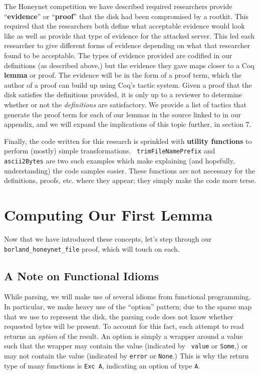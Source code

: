 \documentclass[nocopyrightspace]{sigplanconf}
\begin{document}
The Honeynet competition we have described required researchers provide
``{\bf evidence}'' or ``{\bf proof}'' that the disk had been compromised by a
rootkit. This required that the researchers both define what acceptable
evidence would look like as well as provide that type of evidence for the
attacked server. This led each researcher to give different forms of evidence
depending on what that researcher found to be acceptable. The types of
evidence provided are codified in our definitions (as described above,) but
the evidence they gave maps closer to a Coq {\bf lemma} or proof. The evidence
will be in the form of a proof term, which the author of a proof can build up
using Coq's tactic system. Given a proof that the disk satisfies the
definitions provided, it is only up to a reviewer to determine whether or not
the {\em definitions} are satisfactory. We provide a list of tactics that
generate the proof term for each of our lemmas in the source linked to in our
appendix, and we will expand the implications of this topic further, in
section 7.

Finally, the code written for this research is sprinkled with {\bf utility
functions} to perform (mostly) simple transformations. {\tt
trimFileNamePrefix} and {\tt ascii2Bytes} are two such examples which make
explaining (and hopefully, understanding) the code samples easier. These
functions are not necessary for the definitions, proofs, etc. where they
appear; they simply make the code more terse.

\section{Computing Our First Lemma}

Now that we have introduced these concepts, let's step through our {\tt
borland\_honeynet\_file} proof, which will touch on each.

\subsection{A Note on Functional Idioms}

While parsing, we will make use of several idioms from functional programming.
In particular, we make heavy use of the ``option'' pattern; due to the sparse
map that we use to represent the disk, the parsing code does not know whether
requested bytes will be present. To account for this fact, each attempt to
read returns an {\em option} of the result. An option is simply a wrapper
around a value such that the wrapper may contain the value (indicated by {\tt
value} or {\tt Some},) or may not contain the value (indicated by {\tt error}
or {\tt None}.)  This is why the return type of many functions is {\tt Exc A},
indicating an option of type {\tt A}. 
\end{document}
